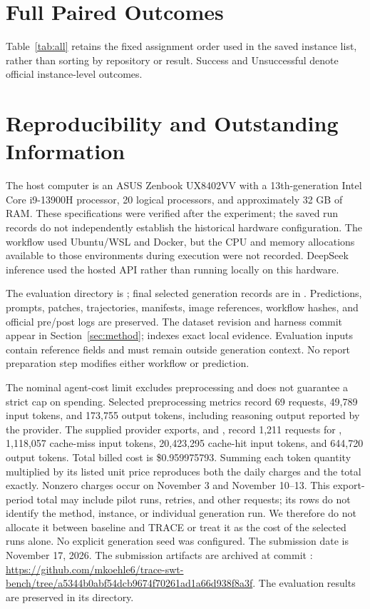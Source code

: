 \onecolumn
\section{Full Paired Outcomes}\label{app:outcomes}
Table~\ref{tab:all} retains the fixed assignment order used in the saved instance list, rather than sorting by repository or result. Success and Unsuccessful denote official instance-level outcomes.


\twocolumn
\section{Reproducibility and Outstanding Information}\label{app:repro}
The host computer is an ASUS Zenbook UX8402VV with a 13th-generation Intel Core i9-13900H processor, 20 logical processors, and approximately 32 GB of RAM. These specifications were verified after the experiment; the saved run records do not independently establish the historical hardware configuration. The workflow used Ubuntu/WSL and Docker, but the CPU and memory allocations available to those environments during execution were not recorded. DeepSeek inference used the hosted API rather than running locally on this hardware.

The evaluation directory is ; final selected generation records are in . Predictions, prompts, patches, trajectories, manifests, image references, workflow hashes, and official pre/post logs are preserved. The dataset revision and harness commit appear in Section~\ref{sec:method};  indexes exact local evidence. Evaluation inputs contain reference fields and must remain outside generation context. No report preparation step modifies either workflow or prediction.

The nominal agent-cost limit excludes preprocessing and does not guarantee a strict cap on spending. Selected preprocessing metrics record 69 requests, 49,789 input tokens, and 173,755 output tokens, including reasoning output reported by the provider. The supplied provider exports,  and , record 1,211 requests for , 1,118,057 cache-miss input tokens, 20,423,295 cache-hit input tokens, and 644,720 output tokens. Total billed cost is \$0.959975793. Summing each token quantity multiplied by its listed unit price reproduces both the daily charges and the total exactly. Nonzero charges occur on November 3 and November 10--13. This export-period total may include pilot runs, retries, and other requests; its rows do not identify the method, instance, or individual generation run. We therefore do not allocate it between baseline and TRACE or treat it as the cost of the selected runs alone. No explicit generation seed was configured. The submission date is November 17, 2026. The submission artifacts are archived at commit : \url{https://github.com/mkoehle6/trace-swt-bench/tree/a5344b0abf54dcb9674f70261ad1a66d938f8a3f}. The evaluation results are preserved in its  directory.

